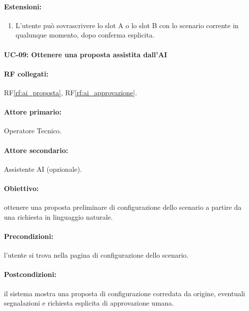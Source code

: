 \paragraph{Estensioni:}
\begin{enumerate}
    \item L'utente può sovrascrivere lo slot A o lo slot B con lo scenario corrente in qualunque momento, dopo conferma esplicita.
\end{enumerate}

\paragraph{\large UC-09: Ottenere una proposta assistita dall'AI}

\paragraph{RF collegati:} RF\ref{rf:ai_proposta}, RF\ref{rf:ai_approvazione}.

\paragraph{Attore primario:} Operatore Tecnico.

\paragraph{Attore secondario:} Assistente AI (opzionale).

\paragraph{Obiettivo:} ottenere una proposta preliminare di configurazione dello scenario a partire da una richiesta in linguaggio naturale.

\paragraph{Precondizioni:} l'utente si trova nella pagina di configurazione dello scenario.

\paragraph{Postcondizioni:} il sistema mostra una proposta di configurazione corredata da origine, eventuali segnalazioni e richiesta esplicita di approvazione umana.

